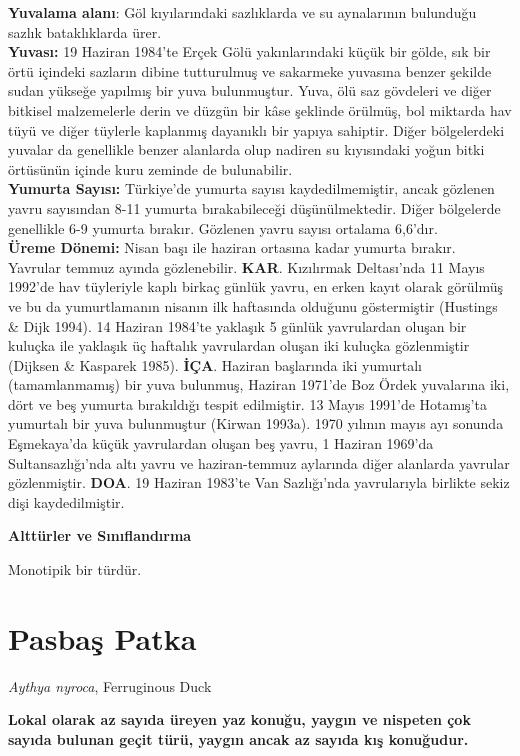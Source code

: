 \documentclass[
  letterpaper,
  DIV=11,
  numbers=noendperiod]{scrreprt}
\begin{document}
\textbf{Yuvalama alanı}: Göl kıyılarındaki sazlıklarda ve su aynalarının
bulunduğu sazlık bataklıklarda ürer.\\
\textbf{Yuvası:} 19 Haziran 1984'te Erçek Gölü yakınlarındaki küçük bir
gölde, sık bir örtü içindeki sazların dibine tutturulmuş ve sakarmeke
yuvasına benzer şekilde sudan yükseğe yapılmış bir yuva bulunmuştur.
Yuva, ölü saz gövdeleri ve diğer bitkisel malzemelerle derin ve düzgün
bir kâse şeklinde örülmüş, bol miktarda hav tüyü ve diğer tüylerle
kaplanmış dayanıklı bir yapıya sahiptir. Diğer bölgelerdeki yuvalar da
genellikle benzer alanlarda olup nadiren su kıyısındaki yoğun bitki
örtüsünün içinde kuru zeminde de bulunabilir.\\
\textbf{Yumurta Sayısı:} Türkiye'de yumurta sayısı kaydedilmemiştir,
ancak gözlenen yavru sayısından 8-11 yumurta bırakabileceği
düşünülmektedir. Diğer bölgelerde genellikle 6-9 yumurta bırakır.
Gözlenen yavru sayısı ortalama 6,6'dır.\\
\textbf{Üreme Dönemi:} Nisan başı ile haziran ortasına kadar yumurta
bırakır. Yavrular temmuz ayında gözlenebilir. \textbf{KAR}. Kızılırmak
Deltası'nda 11 Mayıs 1992'de hav tüyleriyle kaplı birkaç günlük yavru,
en erken kayıt olarak görülmüş ve bu da yumurtlamanın nisanın ilk
haftasında olduğunu göstermiştir (Hustings \& Dijk 1994). 14 Haziran
1984'te yaklaşık 5 günlük yavrulardan oluşan bir kuluçka ile yaklaşık üç
haftalık yavrulardan oluşan iki kuluçka gözlenmiştir (Dijksen \&
Kasparek 1985). \textbf{İÇA}. Haziran başlarında iki yumurtalı
(tamamlanmamış) bir yuva bulunmuş, Haziran 1971'de Boz Ördek yuvalarına
iki, dört ve beş yumurta bırakıldığı tespit edilmiştir. 13 Mayıs 1991'de
Hotamış'ta yumurtalı bir yuva bulunmuştur (Kirwan 1993a). 1970 yılının
mayıs ayı sonunda Eşmekaya'da küçük yavrulardan oluşan beş yavru, 1
Haziran 1969'da Sultansazlığı'nda altı yavru ve haziran-temmuz aylarında
diğer alanlarda yavrular gözlenmiştir. \textbf{DOA}. 19 Haziran 1983'te
Van Sazlığı'nda yavrularıyla birlikte sekiz dişi kaydedilmiştir.

\textbf{Alttürler ve Sınıflandırma}

Monotipik bir türdür.

\section{Pasbaş Patka}\label{pasbaux15f-patka}

\emph{Aythya nyroca}, Ferruginous Duck

\textbf{Lokal olarak az sayıda üreyen yaz konuğu, yaygın ve nispeten çok
sayıda bulunan geçit türü, yaygın ancak az sayıda kış konuğudur.}
\end{document}
